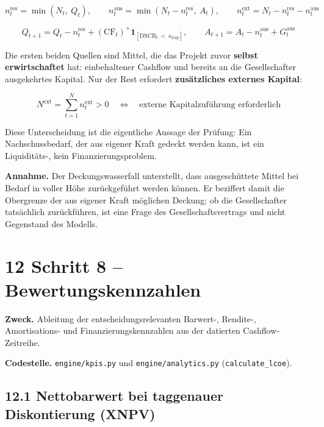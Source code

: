 \documentclass[
  a4paper,
  10pt]{article}
\renewenvironment{quote}
  {\begin{tcolorbox}[
      enhanced,
      breakable,
      colback=Wash,
      colframe=Brand,
      boxrule=0pt,
      leftrule=2.2pt,
      arc=0pt,
      left=8pt,right=8pt,top=6pt,bottom=6pt,
      before skip=8pt,after skip=9pt
    ]\small\color{InkSoft}}
  {\end{tcolorbox}}
\begin{document}
\[ n^{\mathrm{res}}_t = \min(N_t,\ Q_t), \qquad n^{\mathrm{aus}}_t = \min\left(N_t - n^{\mathrm{res}}_t,\ A_t\right), \qquad n^{\mathrm{ext}}_t = N_t - n^{\mathrm{res}}_t - n^{\mathrm{aus}}_t \]

\[ Q_{t+1} = Q_t - n^{\mathrm{res}}_t + \left(\mathrm{CF}_t\right)^{+}\mathbf{1}_{[\mathrm{DSCR}_t\, <\, s_{\mathrm{trap}}]}, \qquad A_{t+1} = A_t - n^{\mathrm{aus}}_t + G_t^{\mathrm{aus}} \]

Die ersten beiden Quellen sind Mittel, die das Projekt zuvor
\textbf{selbst erwirtschaftet} hat: einbehaltener Cashflow und bereits
an die Gesellschafter ausgekehrtes Kapital. Nur der Rest erfordert
\textbf{zusätzliches externes Kapital}:

\[ N^{\mathrm{ext}} = \sum_{t=1}^{N} n^{\mathrm{ext}}_t > 0 \quad \Longleftrightarrow \quad \text{externe Kapitalzuführung erforderlich} \]

Diese Unterscheidung ist die eigentliche Aussage der Prüfung: Ein
Nachschussbedarf, der aus eigener Kraft gedeckt werden kann, ist ein
Liquiditäts-, kein Finanzierungsproblem.

\begin{quote}
\textbf{Annahme.} Der Deckungswasserfall unterstellt, dass
ausgeschüttete Mittel bei Bedarf in voller Höhe zurückgeführt werden
können. Er beziffert damit die Obergrenze der aus eigener Kraft
möglichen Deckung; ob die Gesellschafter tatsächlich zurückführen, ist
eine Frage des Gesellschaftsvertrags und nicht Gegenstand des Modells.
\end{quote}

\hypertarget{schritt-8-bewertungskennzahlen}{%
\section{12 Schritt 8 --
Bewertungskennzahlen}\label{schritt-8-bewertungskennzahlen}}

\textbf{Zweck.} Ableitung der entscheidungsrelevanten Barwert-,
Rendite-, Amortisations- und Finanzierungskennzahlen aus der datierten
Cashflow-Zeitreihe.

\textbf{Codestelle.} \nolinkurl{engine/kpis.py} und
\nolinkurl{engine/analytics.py} (\texttt{calculate\_lcoe}).

\hypertarget{nettobarwert-bei-taggenauer-diskontierung-xnpv}{%
\subsection{12.1 Nettobarwert bei taggenauer Diskontierung
(XNPV)}\label{nettobarwert-bei-taggenauer-diskontierung-xnpv}}
\end{document}
